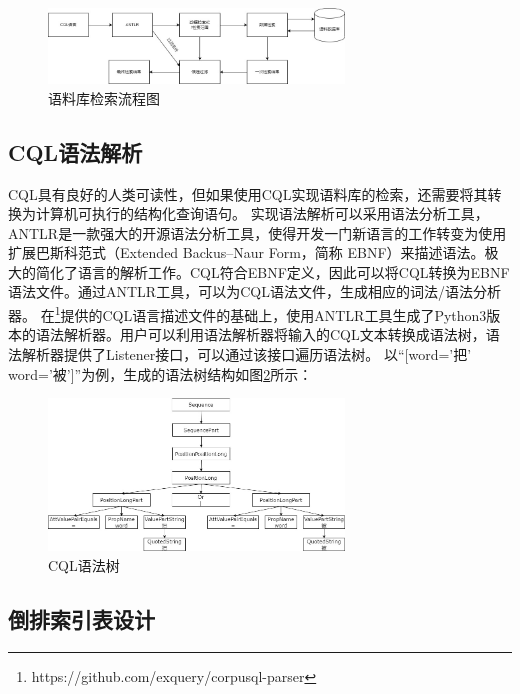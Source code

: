 \documentclass[11pt]{article}
\begin{document}
\begin{CJK*}{UTF8}{gbsn}
\begin{figure}[!h]
	\centering
	\includegraphics[width=0.7\textwidth]{image/liuchengtu.jpg}
	\caption{语料库检索流程图}
	\label{fig:liucheng}
\end{figure}



\subsection{CQL语法解析}

CQL具有良好的人类可读性，但如果使用CQL实现语料库的检索，还需要将其转换为计算机可执行的结构化查询语句。
实现语法解析可以采用语法分析工具，ANTLR是一款强大的开源语法分析工具，使得开发一门新语言的工作转变为使用扩展巴斯科范式（Extended Backus–Naur Form，简称 EBNF）来描述语法。极大的简化了语言的解析工作。CQL符合EBNF定义，因此可以将CQL转换为EBNF语法文件。通过ANTLR工具，可以为CQL语法文件，生成相应的词法/语法分析器。
在\footnote[1]{https://github.com/exquery/corpusql-parser}提供的CQL语言描述文件的基础上，使用ANTLR工具生成了Python3版本的语法解析器。用户可以利用语法解析器将输入的CQL文本转换成语法树，语法解析器提供了Listener接口，可以通过该接口遍历语法树。
以“[word='把' \textbar word='被']”为例，生成的语法树结构如图\ref{fig:yufashu}所示：

\begin{figure}[!h]
	\centering
	\includegraphics[width=0.7\textwidth]{image/yufashu.jpg}
	\caption{CQL语法树}
	\label{fig:yufashu}
\end{figure}

\subsection{倒排索引表设计}


\end{CJK*}
\end{document}
